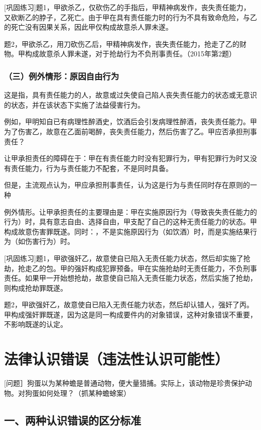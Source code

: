 [巩固练习]题1，甲欲杀乙，仅砍伤乙的手指后，甲精神病发作，丧失责任能力，又砍断乙的脖子，乙死亡。由于甲在具有责任能力时的行为不具有致命危险，与乙的死亡没有因果关系，因此甲仅构成故意杀人罪未遂。

题2，甲欲杀乙，用刀砍伤乙后，甲精神病发作，丧失责任能力，抢走了乙的财物。甲构成故意杀人罪未遂，对于抢劫行为不负刑事责任。（2015年第2题）

\subsubsection*{（三）例外情形：原因自由行为}

这是指，具有责任能力的人，故意或过失使自己陷人丧失责任能力的状态或无意识的状态，并在该状态下实施了法益侵害行为。

例如，甲明知自已有病理性醉酒史，饮酒后会引发病理性醉酒，丧失责任能力。甲为了伤害乙，故意在乙面前喝醉，丧失责任能力，然后伤害了乙。甲应否承担刑事责任？

让甲承担责任的障碍在于：甲在有责任能力时没有犯罪行为，甲有犯罪行为时又没有责任能力，行为与责任能力不配套，不是同时具备。

但是，主流观点认为，甲应承担刑事责任，认为这是行为与责任同时存在原则的一种

例外情形。让甲承担责任的主要理由是：甲在实施原因行为（导致丧失责任能力的行为）时，具有意志自由、选择自由，甲支配了自己的这种无责任能力的状态。甲构成故意伤害罪既遂。同时：，不是实施原因行为（如饮酒）时，而是实施结果行为（如伤害行为）时。

[巩固练习]题1，甲欲强奸乙，故意使自已陷入无责任能力状态，然后却实施了抢劫，抢走乙的包。甲的强奸构成犯罪预备。甲在实施抢劫时无责任能力，不负刑事责任。如果甲一开始想抢劫，故意使自已陷入无责任能力状态，然后实施了抢劫，则构成抢劫罪既遂。

题2，甲欲强奸乙，故意使自已陷入无责任能力状态，然后却认错人，强奸了丙。甲构成强奸罪既遂，因为这是同一构成要件内的对象错误，这种对象错误不重要，不影响既遂的认定。

\section{法律认识错误（违法性认识可能性）}

[问题］狗蛋以为某种蟾是普通动物，便大量猎捕。实际上，该动物是珍贵保护动物。对狗蛋如何处理？（抓某种蟾蜍案）

\subsection*{一、两种认识错误的区分标准}

